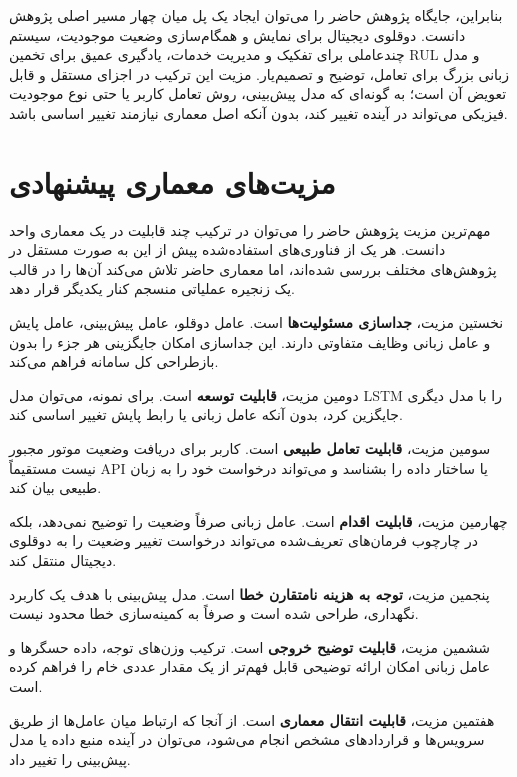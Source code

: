 \documentclass[a4paper,fleqn]{report}
\begin{document}
بنابراین، جایگاه پژوهش حاضر را می‌توان ایجاد یک پل میان چهار مسیر
اصلی پژوهش دانست. دوقلوی دیجیتال برای نمایش و همگام‌سازی وضعیت
موجودیت، سیستم چندعاملی برای تفکیک و مدیریت خدمات، یادگیری عمیق برای
تخمین \gls{RUL} و مدل زبانی بزرگ برای تعامل، توضیح و تصمیم‌یار. مزیت این ترکیب در اجزای مستقل و قابل تعویض آن است؛ به گونه‌ای که مدل پیش‌بینی، روش تعامل کاربر یا حتی نوع موجودیت فیزیکی می‌تواند در آینده تغییر کند، بدون آنکه اصل معماری نیازمند تغییر اساسی باشد.




\section{مزیت‌های معماری پیشنهادی}
\label{sec:architecture-benefits}

مهم‌ترین مزیت پژوهش حاضر را می‌توان در ترکیب چند قابلیت در یک معماری واحد دانست. هر یک از فناوری‌های استفاده‌شده پیش از این به صورت مستقل در پژوهش‌های مختلف بررسی شده‌اند، اما معماری حاضر تلاش می‌کند آن‌ها را در قالب یک زنجیره عملیاتی منسجم کنار یکدیگر قرار دهد.

نخستین مزیت، \textbf{جداسازی مسئولیت‌ها} است. عامل دوقلو، عامل پیش‌بینی، عامل پایش و عامل زبانی وظایف متفاوتی دارند. این جداسازی امکان جایگزینی هر جزء را بدون بازطراحی کل سامانه فراهم می‌کند.

دومین مزیت، \textbf{قابلیت توسعه} است. برای نمونه، می‌توان مدل LSTM را با مدل دیگری جایگزین کرد، بدون آنکه عامل زبانی یا رابط پایش تغییر اساسی کند.

سومین مزیت، \textbf{قابلیت تعامل طبیعی} است. کاربر برای دریافت وضعیت موتور مجبور نیست مستقیماً API یا ساختار داده را بشناسد و می‌تواند درخواست خود را به زبان طبیعی بیان کند.

چهارمین مزیت، \textbf{قابلیت اقدام} است. عامل زبانی صرفاً وضعیت را توضیح نمی‌دهد، بلکه در چارچوب فرمان‌های تعریف‌شده می‌تواند درخواست تغییر وضعیت را به دوقلوی دیجیتال منتقل کند.

پنجمین مزیت، \textbf{توجه به هزینه نامتقارن خطا} است. مدل پیش‌بینی با هدف یک کاربرد نگهداری، طراحی شده است و صرفاً به کمینه‌سازی خطا محدود نیست.

ششمین مزیت، \textbf{قابلیت توضیح خروجی} است. ترکیب وزن‌های توجه، داده حسگرها و عامل زبانی امکان ارائه توضیحی قابل فهم‌تر از یک مقدار عددی خام را فراهم کرده است.

هفتمین مزیت، \textbf{قابلیت انتقال معماری} است. از آنجا که ارتباط میان عامل‌ها از طریق سرویس‌ها و قراردادهای مشخص انجام می‌شود، می‌توان در آینده منبع داده یا مدل پیش‌بینی را تغییر داد.
\end{document}
